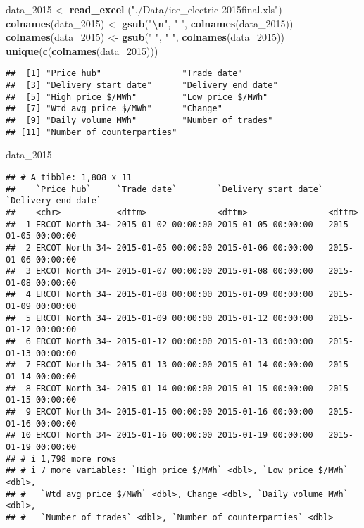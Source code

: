 \documentclass[
]{article}
\newenvironment{Shaded}{\begin{snugshade}}{\end{snugshade}}
\newcommand{\FunctionTok}[1]{\textcolor[rgb]{0.13,0.29,0.53}{\textbf{#1}}}
\newcommand{\NormalTok}[1]{#1}
\newcommand{\OtherTok}[1]{\textcolor[rgb]{0.56,0.35,0.01}{#1}}
\newcommand{\SpecialCharTok}[1]{\textcolor[rgb]{0.81,0.36,0.00}{\textbf{#1}}}
\newcommand{\StringTok}[1]{\textcolor[rgb]{0.31,0.60,0.02}{#1}}
\begin{document}
\begin{Shaded}
\begin{Highlighting}[]
\NormalTok{data\_2015 }\OtherTok{\textless{}{-}} \FunctionTok{read\_excel}\NormalTok{ (}\StringTok{"./Data/ice\_electric{-}2015final.xls"}\NormalTok{)}
\FunctionTok{colnames}\NormalTok{(data\_2015) }\OtherTok{\textless{}{-}} \FunctionTok{gsub}\NormalTok{(}\StringTok{"}\SpecialCharTok{\textbackslash{}n}\StringTok{"}\NormalTok{, }\StringTok{" "}\NormalTok{, }\FunctionTok{colnames}\NormalTok{(data\_2015))}
\FunctionTok{colnames}\NormalTok{(data\_2015) }\OtherTok{\textless{}{-}} \FunctionTok{gsub}\NormalTok{(}\StringTok{"  "}\NormalTok{, }\StringTok{" "}\NormalTok{, }\FunctionTok{colnames}\NormalTok{(data\_2015))}
\FunctionTok{unique}\NormalTok{(}\FunctionTok{c}\NormalTok{(}\FunctionTok{colnames}\NormalTok{(data\_2015)))}
\end{Highlighting}
\end{Shaded}

\begin{verbatim}
##  [1] "Price hub"                "Trade date"              
##  [3] "Delivery start date"      "Delivery end date"       
##  [5] "High price $/MWh"         "Low price $/MWh"         
##  [7] "Wtd avg price $/MWh"      "Change"                  
##  [9] "Daily volume MWh"         "Number of trades"        
## [11] "Number of counterparties"
\end{verbatim}

\begin{Shaded}
\begin{Highlighting}[]
\NormalTok{data\_2015}
\end{Highlighting}
\end{Shaded}

\begin{verbatim}
## # A tibble: 1,808 x 11
##    `Price hub`     `Trade date`        `Delivery start date` `Delivery end date`
##    <chr>           <dttm>              <dttm>                <dttm>             
##  1 ERCOT North 34~ 2015-01-02 00:00:00 2015-01-05 00:00:00   2015-01-05 00:00:00
##  2 ERCOT North 34~ 2015-01-05 00:00:00 2015-01-06 00:00:00   2015-01-06 00:00:00
##  3 ERCOT North 34~ 2015-01-07 00:00:00 2015-01-08 00:00:00   2015-01-08 00:00:00
##  4 ERCOT North 34~ 2015-01-08 00:00:00 2015-01-09 00:00:00   2015-01-09 00:00:00
##  5 ERCOT North 34~ 2015-01-09 00:00:00 2015-01-12 00:00:00   2015-01-12 00:00:00
##  6 ERCOT North 34~ 2015-01-12 00:00:00 2015-01-13 00:00:00   2015-01-13 00:00:00
##  7 ERCOT North 34~ 2015-01-13 00:00:00 2015-01-14 00:00:00   2015-01-14 00:00:00
##  8 ERCOT North 34~ 2015-01-14 00:00:00 2015-01-15 00:00:00   2015-01-15 00:00:00
##  9 ERCOT North 34~ 2015-01-15 00:00:00 2015-01-16 00:00:00   2015-01-16 00:00:00
## 10 ERCOT North 34~ 2015-01-16 00:00:00 2015-01-19 00:00:00   2015-01-19 00:00:00
## # i 1,798 more rows
## # i 7 more variables: `High price $/MWh` <dbl>, `Low price $/MWh` <dbl>,
## #   `Wtd avg price $/MWh` <dbl>, Change <dbl>, `Daily volume MWh` <dbl>,
## #   `Number of trades` <dbl>, `Number of counterparties` <dbl>
\end{verbatim}
\end{document}
